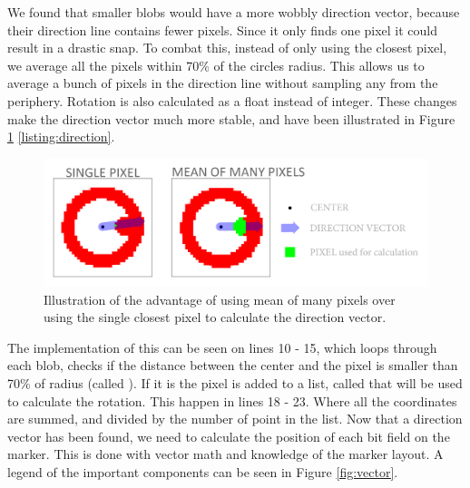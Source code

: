 We found that smaller blobs would have a more wobbly direction vector, because their direction line contains fewer pixels. Since it only finds one pixel it could result in a drastic snap. To combat this, instead of only using the closest pixel, we average all the pixels within 70\% of the circles radius. This allows us to average a bunch of pixels in the direction line without sampling any from the
periphery. Rotation is also calculated as a float instead of integer. These changes make the direction vector much more stable, and have been illustrated in Figure \ref{fig:lowpixel}
\ref{listing:direction}.\begin{figure}[H]
	\centering
	\includegraphics[width=1\linewidth]{figure/Analysis/lowpixel.png}
	\caption{Illustration of the advantage of using mean of many pixels over using the single closest pixel to calculate the direction vector.} 
	\label{fig:lowpixel}
\end{figure}
The implementation of this can be seen on lines 10 - 15, which loops through each blob, checks if the distance between the center and the pixel is smaller than 70\% of radius (called ). If it is the pixel is added to a list, called  that will be used to calculate the rotation. This happen in lines 18 - 23. Where all the coordinates are summed, and divided by the number of point in the list.
Now that a direction vector has been found, we need to calculate the position of each bit field on the marker. This is done with vector math and knowledge of the marker layout. A legend of the important components can be seen in Figure \ref{fig:vector}.


